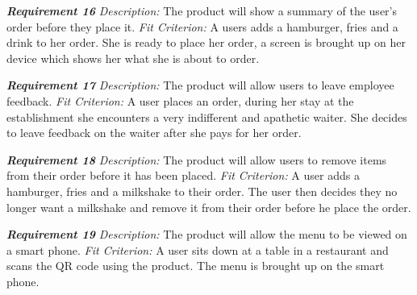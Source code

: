 \documentclass[12pt, titlepage]{article}
\begin{document}
\noindent\textbf{\textit{Requirement 16}}\newline
\textit{Description:}\newline
The product will show a summary of the user's order before they place it. \newline\newline
\textit{Fit Criterion:}\newline 
A users adds a hamburger, fries and a drink to her order. She is ready to place her order, a screen is brought up on her device which shows her what she is about to order.
\newline

\noindent\textbf{\textit{Requirement 17}}\newline
\textit{Description:}\newline
The product will allow users to leave employee feedback. \newline\newline
\textit{Fit Criterion:}\newline 
A user places an order, during her stay at the establishment she encounters a very indifferent and apathetic waiter. She decides to leave feedback on the waiter after she pays for her order.
\newline

\noindent\textbf{\textit{Requirement 18}}\newline
\textit{Description:}\newline
The product will allow users to remove items from their order before it has been placed. \newline\newline
\textit{Fit Criterion:}\newline 
A user adds a hamburger, fries and a milkshake to their order. The user then decides they no longer want a milkshake and remove it from their order before he place the order.
\newline

\noindent\textbf{\textit{Requirement 19}}\newline
\textit{Description:}\newline
The product will allow the menu to be viewed on a smart phone. \newline\newline
\textit{Fit Criterion:}\newline 
A user sits down at a table in a restaurant and scans the QR code using the product. The menu is brought up on the smart phone.
\newline
\end{document}
